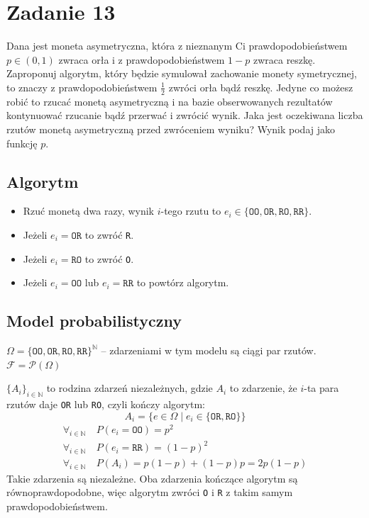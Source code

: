 \section{Zadanie 13}
Dana jest moneta asymetryczna, która z nieznanym Ci prawdopodobieństwem
\(p \in (0, 1)\) zwraca orła i z prawdopodobieństwem \(1 - p\) zwraca reszkę.
Zaproponuj algorytm, który będzie symulował zachowanie monety symetrycznej,
to znaczy z prawdopodobieństwem \(\frac{1}{2}\) zwróci orła bądź reszkę.
Jedyne co możesz robić to rzucać monetą asymetryczną i na bazie obserwowanych
rezultatów kontynuować rzucanie bądź przerwać i zwrócić wynik.
Jaka jest oczekiwana liczba rzutów monetą asymetryczną przed zwróceniem wyniku?
Wynik podaj jako funkcję \(p\).

\subsection*{Algorytm}
\begin{itemize}
	\item Rzuć monetą dwa razy, wynik \(i\)-tego rzutu to \(e_i \in \{\texttt{OO}, \texttt{OR}, \texttt{RO}, \texttt{RR}\}\).
	\item Jeżeli \(e_i = \texttt{OR}\) to zwróć \texttt{R}.
	\item Jeżeli \(e_i = \texttt{RO}\) to zwróć \texttt{O}.
	\item Jeżeli \(e_i = \texttt{OO}\) lub \(e_i = \texttt{RR}\) to powtórz algorytm.
\end{itemize}

\subsection*{Model probabilistyczny}
\(\Omega = \{\texttt{OO}, \texttt{OR}, \texttt{RO}, \texttt{RR}\}^\mathbb{N}\)
-- zdarzeniami w tym modelu są ciągi par rzutów.\\
\(\mathcal{F} = \mathcal{P}(\Omega)\)

\(\{ A_i \}_{i \in \mathbb{N}}\) to rodzina zdarzeń niezależnych, gdzie \(A_i\) to zdarzenie,
że \(i\)-ta para rzutów daje \texttt{OR} lub \texttt{RO}, czyli kończy algorytm:
\[
	A_i = \Big\{ e \in \Omega \mid e_i \in \{\texttt{OR}, \texttt{RO}\} \Big\}
\]
\begin{align*}
	\forall_{i \in \mathbb{N}}\  & P(e_i = \texttt{OO}) = p^2         \\
	\forall_{i \in \mathbb{N}}\  & P(e_i = \texttt{RR}) = (1-p)^2     \\
	\forall_{i \in \mathbb{N}}\  & P(A_i) = p(1-p) + (1-p)p = 2p(1-p)
\end{align*}
Takie zdarzenia są niezależne.
Oba zdarzenia kończące algorytm są równoprawdopodobne, więc algorytm zwróci
\texttt{O} i \texttt{R} z takim samym prawdopodobieństwem.

